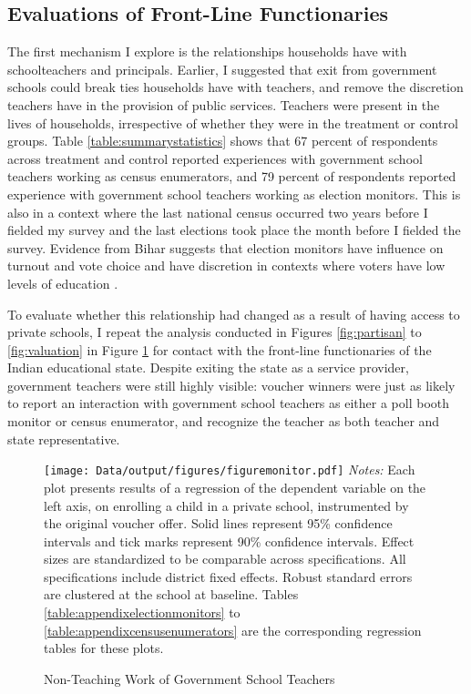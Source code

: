 \documentclass[hidelinks, 12pt, titlepage]{article}
\begin{document}
	\subsection*{Evaluations of Front-Line Functionaries}

		The first mechanism I explore is the relationships households have with schoolteachers and principals.  Earlier, I suggested that exit from government schools could break ties households have with teachers, and remove the discretion teachers have in the provision of public services.  Teachers were present in the lives of households, irrespective of whether they were in the treatment or control groups.  Table \ref{table:summarystatistics} shows that 67 percent of respondents across treatment and control reported experiences with government school teachers working as census enumerators, and 79 percent of respondents reported experience with government school teachers working as election monitors. This is also in a context where the last national census occurred two years before I fielded my survey and the last elections took place the month before I fielded the survey.  Evidence from Bihar suggests that election monitors have influence on turnout and vote choice and have discretion in contexts where voters have low levels of education \citep{Neggers2018}.

		To evaluate whether this relationship had changed as a result of having access to private schools, I repeat the analysis conducted in Figures \ref{fig:partisan} to \ref{fig:valuation} in Figure \ref{fig:monitor} for contact with the front-line functionaries of the Indian educational state.  Despite exiting the state as a service provider, government teachers were still highly visible: voucher winners were just as likely to report an interaction with government school teachers as either a poll booth monitor or census enumerator, and recognize the teacher as both teacher and state representative.

		\begin{figure}[htbp]
			\caption{Non-Teaching Work of Government School Teachers\label{fig:monitor}}
			\centering
			\begin{minipage}{5.5in}
				\texttt{[image: Data/output/figures/figuremonitor.pdf]}
				\footnotesize
				\emph{Notes:} Each plot presents results of a regression of the dependent variable on the left axis, on enrolling a child in a private school, instrumented by the original voucher offer.  Solid lines represent 95\% confidence intervals and tick marks represent 90\% confidence intervals.  Effect sizes are standardized to be comparable across specifications.  All specifications include district fixed effects.  Robust standard errors are clustered at the school at baseline. Tables \ref{table:appendixelectionmonitors} to \ref{table:appendixcensusenumerators} are the corresponding regression tables for these plots.
			\end{minipage}
		\end{figure}
\end{document}
